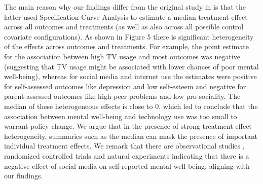 \documentclass[11pt, a4paper]{article}
\begin{document}
\begin{enumerate}[leftmargin=*]
\color{blue}
The main reason why our findings differ from the original study in \cite{orben:2019} is that the latter used Specification Curve Analysis to estimate a median treatment effect across all outcomes and treatments (as well as also across all possible control covariate configurations). As shown in Figure 5 there is significant heterogeneity of the effects across outcomes and treatments. For example, the point estimate for the association between high TV usage and most outcomes was negative (suggesting that TV usage might be associated with lower chances of poor mental well-being), whereas for social media and internet use the estimates were positive for self-assessed outcomes like depression and low self-esteem and negative for parent-assessed outcomes like high peer problems and low pro-sociality. The median of these heterogeneous effects is close to 0, which led \cite{orben:2019} to conclude that the association between mental well-being and technology use was too small to warrant policy change. We argue that in the presence of strong treatment effect heterogeneity, summaries such as the median can mask the presence of important individual treatment effects.
We remark that there are observational studies \cite{valkenburg:2022}, randomized controlled trials \cite{allcott:2020,allcott:2022} and natural experiments \cite{braghieri:2022} indicating that there is a negative effect of social media on self-reported mental well-being, aligning with our findings.

\color{black}

    \vspace{0.5cm}
\end{enumerate}





\end{document}
